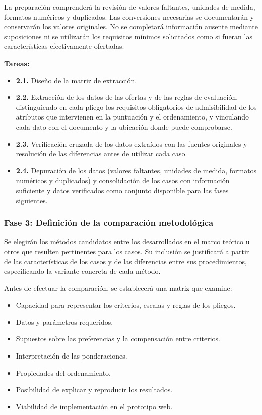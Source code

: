 \documentclass[12pt,a4paper]{article}
\begin{document}
La preparación comprenderá la revisión de valores faltantes, unidades de medida, formatos numéricos y duplicados. Las conversiones necesarias se documentarán y conservarán los valores originales. No se completará información ausente mediante suposiciones ni se utilizarán los requisitos mínimos solicitados como si fueran las características efectivamente ofertadas.

\textbf{Tareas:}

\begin{itemize}
\item \textbf{2.1.} Diseño de la matriz de extracción.
\item \textbf{2.2.} Extracción de los datos de las ofertas y de las reglas de evaluación, distinguiendo en cada pliego los requisitos obligatorios de admisibilidad de los atributos que intervienen en la puntuación y el ordenamiento, y vinculando cada dato con el documento y la ubicación donde puede comprobarse.
\item \textbf{2.3.} Verificación cruzada de los datos extraídos con las fuentes originales y resolución de las diferencias antes de utilizar cada caso.
\item \textbf{2.4.} Depuración de los datos (valores faltantes, unidades de medida, formatos numéricos y duplicados) y consolidación de los casos con información suficiente y datos verificados como conjunto disponible para las fases siguientes.
\end{itemize}

\subsubsection{Fase 3: Definición de la comparación metodológica}

Se elegirán los métodos candidatos entre los desarrollados en el marco teórico u otros que resulten pertinentes para los casos. Su inclusión se justificará a partir de las características de los casos y de las diferencias entre sus procedimientos, especificando la variante concreta de cada método.

Antes de efectuar la comparación, se establecerá una matriz que examine:

\begin{itemize}
\item Capacidad para representar los criterios, escalas y reglas de los pliegos.
\item Datos y parámetros requeridos.
\item Supuestos sobre las preferencias y la compensación entre criterios.
\item Interpretación de las ponderaciones.
\item Propiedades del ordenamiento.
\item Posibilidad de explicar y reproducir los resultados.
\item Viabilidad de implementación en el prototipo web.
\end{itemize}
\end{document}
